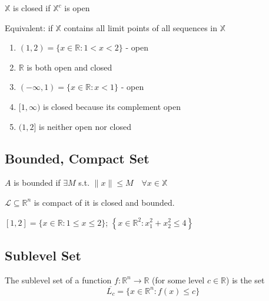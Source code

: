 \documentclass[11pt]{elegantbook}
\begin{document}
\begin{definition}
    $\mathbb{X}$ is closed if $\mathbb{X}^c$ is open

    Equivalent: if $\mathbb{X}$ contains all limit points of all sequences in $\mathbb{X}$
\end{definition}
\begin{example}
\end{example}
\begin{enumerate}[1)]
    \item $(1,2)=\{x \in \mathbb{R}: 1<x<2\}$ - open
    \item $\mathbb{R}$ is both open and closed
    \item $(-\infty, 1)=\{x \in \mathbb{R}: x<1\}$ - open
    \item $[1, \infty)$ is closed because its complement open
    \item $(1,2]$ is neither open nor closed
\end{enumerate}

\subsection{Bounded, Compact Set}
\begin{definition}
    \normalfont
    $A$ is bounded if $\exists M$ s.t. $\|x\| \leqslant M \quad \forall x \in\mathbb{X}$
\end{definition}

\begin{definition}
    \normalfont
    $\mathcal{L} \subseteq \mathbb{R}^{n}$ is compact of it is closed and bounded.
\end{definition}

\begin{example}
    \normalfont
    $[1,2]=\{x \in \mathbb{R}: 1 \leqslant x \leqslant 2\}$; $\left\{x \in \mathbb{R}^{2}\right.: \left.x_{1}^{2}+x_{2}^{2} \leqslant 4\right\}$
\end{example}

\subsection{Sublevel Set}
\begin{definition}
    \normalfont
    The sublevel set of a function $f: \mathbb{R}^n \rightarrow \mathbb{R}$ (for some level $c\in \mathbb{R}$) is the set $$\overline{L_c}=\{x\in \mathbb{R}^n:f(x)\leq c\}$$
\end{definition}
\end{document}
